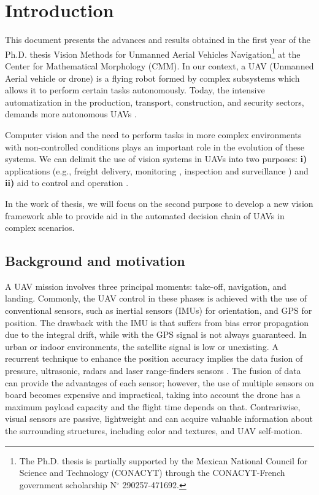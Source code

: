 \chapter{Introduction}


This document presents the advances and results obtained in the first year of the Ph.D. thesis Vision Methods for Unmanned Aerial Vehicles Navigation\footnote{The Ph.D. thesis is partially supported by the Mexican National Council for Science and Technology (CONACYT) through the CONACYT-French government scholarship N$^{\circ}$ 290257-471692.} at the Center for Mathematical Morphology (CMM). In our context, a UAV (Unmanned Aerial vehicle or drone) is a flying robot formed by complex subsystems which allows it to perform certain tasks autonomously. Today, the intensive automatization in the production, transport, construction, and security sectors, demands more autonomous UAVs \cite{ASTechWeb}. 

Computer vision and the need to perform tasks in more complex environments with non-controlled conditions plays an important role in the evolution of these systems. We can delimit the use of vision systems in UAVs into two purposes: \textbf{i)} applications (e.g., freight delivery, monitoring \cite{Gaszczak.Breckon.ea:IRCV:2011}, inspection \cite{Rodriguez.Castiblanco.ea:ICUAS:2014} and surveillance \cite{Saif.Prabuwono.ea:IROS:2013}) and \textbf{ii)} aid to control and operation  \cite{Granlund.Nordberg.ea:ITCE:2000}. 

In the work of thesis, we will focus on the second purpose to develop a new vision framework able to provide aid in the automated decision chain of UAVs in complex scenarios.

\section{Background and motivation}\label{sec:background & motivation}

A UAV mission involves three principal moments: take-off, navigation, and landing. Commonly, the UAV  control in these phases is achieved with the use of conventional sensors, such as inertial sensors (IMUs) for orientation, and GPS for position. The drawback with the IMU is that suffers from bias error propagation due to the integral drift, while with the GPS signal is not always guaranteed. In urban or indoor environments, the satellite signal is low or unexisting. A recurrent technique to enhance the position accuracy implies the data fusion of pressure, ultrasonic, radars and laser range-finders sensors \cite{Tomic.Schmid.ea:IRAM:2012}. The fusion of data can provide the advantages of each sensor; however, the use of multiple sensors on board becomes expensive and impractical, taking into account the drone has a maximum payload capacity and the flight time depends on that. Contrariwise, visual sensors are passive, lightweight and can acquire valuable information about the surrounding structures, including color and textures, and UAV self-motion. 

